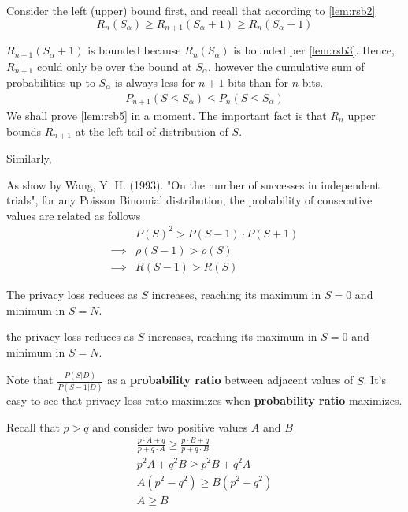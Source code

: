 \documentclass[11pt]{article}
\begin{document}
Consider the left (upper) bound first, and recall that according to \eqref{lem:rsb2}
\[
 R_n(S_\alpha) \ge R_{n+1}(S_\alpha+1) \ge R_n(S_\alpha+1)
 \]
 
$R_{n+1}(S_\alpha+1)$ is bounded because  $R_n(S_\alpha)$ is bounded per \eqref{lem:rsb3}.  Hence, $R_{n+1}$ could only be over the bound at $S_\alpha$, however the cumulative sum of probabilities up to $S_\alpha$ is always less for $n+1$ bits than for $n$ bits.
 \begin{align}  \label{lem:rsb5}
P_{n+1}(S \le S_\alpha) \le P_{n}(S \le S_\alpha)
\end{align}
We shall prove \eqref{lem:rsb5} in a moment. The important fact is that $R_n$ upper bounds $R_{n+1}$ at the left tail of distribution of $S$. 

Similarly, 
 
 
 As show by Wang, Y. H. (1993). "On the number of successes in independent trials", for any Poisson Binomial distribution, the probability of consecutive values are related as follows
 \begin{align*}
 & P(S)^2  > P(S-1) \cdot P(S+1) \\
\implies &  \rho(S-1) > \rho(S) \\
\implies & R(S-1) > R(S)
\end{align*}



\begin{lem} \label{lem:rsreduce}
 The privacy loss reduces as $S$ increases, reaching its maximum in $S=0$ and minimum in $S=N$.
\end{lem}

 the privacy loss reduces as $S$ increases, reaching its maximum in $S=0$ and minimum in $S=N$.







Note that $\frac{P(S | D )}{P(S - 1| D )}$ as a \textbf{probability ratio} between adjacent values of $S$.  It's easy to see that privacy loss ratio maximizes when \textbf{probability ratio} maximizes. 

Recall that $p>q$ and consider two positive values $A$ and $B$ 
\begin{align*}
\frac{ p \cdot A + q } { p + q \cdot A }  \ge \frac{ p \cdot B + q } { p + q \cdot B } \\
p^2A + q^2B \ge p^2 B + q^2 A  \\
A (p^2 - q^2) \ge B (p^2 - q^2)  \\
A \ge B
\end{align*}
\end{document}
